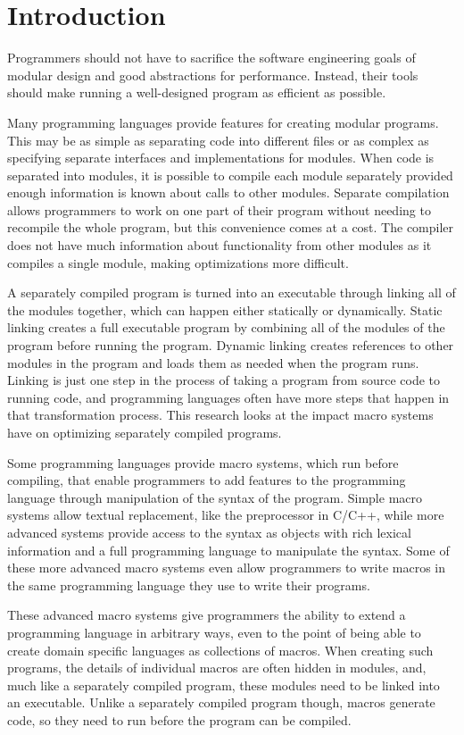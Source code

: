 \chapter{Introduction}
\label{chap:introduction}

Programmers should not have to sacrifice the software engineering goals of modular design and good abstractions for performance. 
Instead, their tools should make running a well-designed program as efficient as possible. 

Many programming languages provide features for creating modular programs. 
This may be as simple as separating code into different files or as complex as specifying separate interfaces and implementations for modules.
When code is separated into modules, it is possible to compile each module separately provided enough information is known about calls to other modules.
Separate compilation allows programmers to work on one part of their program without needing to recompile the whole program, but this convenience comes at a cost.
The compiler does not have much information about functionality from other modules as it compiles a single module, making optimizations more difficult.

A separately compiled program is turned into an executable through linking all of the modules together, which can happen either statically or dynamically.
Static linking creates a full executable program by combining all of the modules of the program before running the program.
Dynamic linking creates references to other modules in the program and loads them as needed when the program runs.
Linking is just one step in the process of taking a program from source code to running code, and programming languages often have more steps that happen in that transformation process.
This research looks at the impact macro systems have on optimizing separately compiled programs.

Some programming languages provide macro systems, which run before compiling, that enable programmers to add features to the programming language through manipulation of the syntax of the program.
Simple macro systems allow textual replacement, like the preprocessor in C/C++, while more advanced systems provide access to the syntax as objects with rich lexical information and a full programming language to manipulate the syntax.
Some of these more advanced macro systems even allow programmers to write macros in the same programming language they use to write their programs. 

These advanced macro systems give programmers the ability to extend a programming language in arbitrary ways, even to the point of being able to create domain specific languages as collections of macros.
When creating such programs, the details of individual macros are often hidden in modules, and, much like a separately compiled program, these modules need to be linked into an executable. 
Unlike a separately compiled program though, macros generate code, so they need to run before the program can be compiled.

